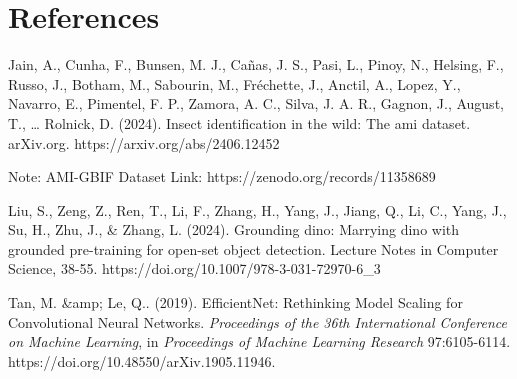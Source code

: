 \documentclass[twocolumn]{article}
\begin{document}
    \section{References}
    \begin{hangparas}{.25in}{1}
    

    Jain, A., Cunha, F., Bunsen, M. J., Cañas, J. S., Pasi, L., Pinoy, N., Helsing, F., Russo, J., Botham, M., 
    Sabourin, M., Fréchette, J., Anctil, A., Lopez, Y., Navarro, E., Pimentel, F. P., Zamora, A. C., Silva, J. A. R., 
    Gagnon, J., August, T., … Rolnick, D. (2024). Insect identification in the wild: The ami dataset. arXiv.org. 
    https://arxiv.org/abs/2406.12452 
    
    Note: AMI-GBIF Dataset Link: https://zenodo.org/records/11358689 

    Liu, S., Zeng, Z., Ren, T., Li, F., Zhang, H., Yang, J., Jiang, Q., Li, C., Yang, J., Su, H., Zhu, J., 
    \& Zhang, L. (2024). Grounding dino: Marrying dino with grounded pre-training for open-set object detection. 
    Lecture Notes in Computer Science, 38-55. https://doi.org/10.1007/978-3-031-72970-6\_3 \newline 

    Tan, M. \&amp; Le, Q.. (2019). EfficientNet: Rethinking Model Scaling for Convolutional Neural Networks. 
    \textit{Proceedings of the 36th International Conference on Machine Learning},
    in \textit{Proceedings of Machine Learning Research} 
    97:6105-6114. https://doi.org/10.48550/arXiv.1905.11946. 

    \end{hangparas}
\end{document}
